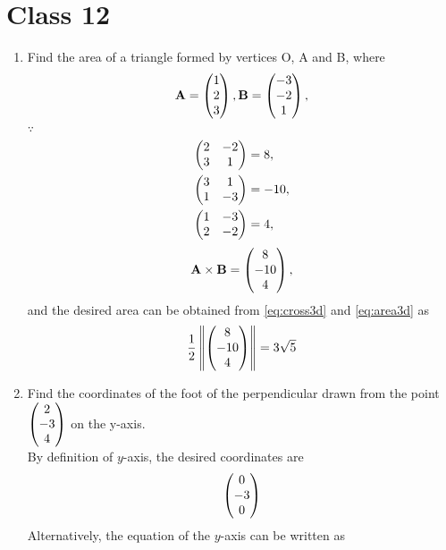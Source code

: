 \documentclass[journal,12pt,twocolumn]{IEEEtran}
\renewcommand\thesection{\arabic{section}}
\begin{document}
\section{Class 12}
\renewcommand{\theequation}{\theenumi}
\begin{enumerate}[label=\thesection.\arabic*.,ref=\thesection.\theenumi]
	\item Find the area of a triangle formed by vertices O, A and B, where 
		\begin{align}
			\mathbf{A} = \begin{pmatrix}1 \\ 2 \\ 3\end{pmatrix},
			\mathbf{B}  = \begin{pmatrix}-3 \\ -2 \\ 1\end{pmatrix},
		\end{align}
\solution $\because $
		\begin{align}
			\begin{pmatrix}2 & -2 \\ 3 & 1 \end{pmatrix} &= 8,
\\
			\begin{pmatrix}3 & 1 \\ 1 & -3 \end{pmatrix} &= -10,
			\\
			\begin{pmatrix}1 & -3 \\ 2 & -2 \end{pmatrix} &= 4,
		\end{align}
		\begin{align}
			\mathbf{A}  \times 
			\mathbf{B}  = \begin{pmatrix}8 \\ -10 \\ 4\end{pmatrix},
		\end{align}
		and the  desired area can be obtained from 
  \eqref{eq:cross3d} and 
  \eqref{eq:area3d} as
		\begin{align}
			\frac{1}{2}\left\lVert\begin{pmatrix}8 \\ -10 \\ 4\end{pmatrix}\right\rVert = 3 \sqrt{5}
		\end{align}
	\item  Find the coordinates of the foot of the perpendicular drawn from the point $ \begin{pmatrix}2 \\-3 \\4 \end{pmatrix} $ on the y-axis.
		\\
\solution By definition of $y$-axis, the desired coordinates are 
		\begin{align}
			\begin{pmatrix}0 \\ -3 \\ 0\end{pmatrix} 
		\end{align}
	Alternatively, the equation of the $y$-axis can be written as	
		\begin{align}

\end{align}
\end{enumerate}
\end{document}
